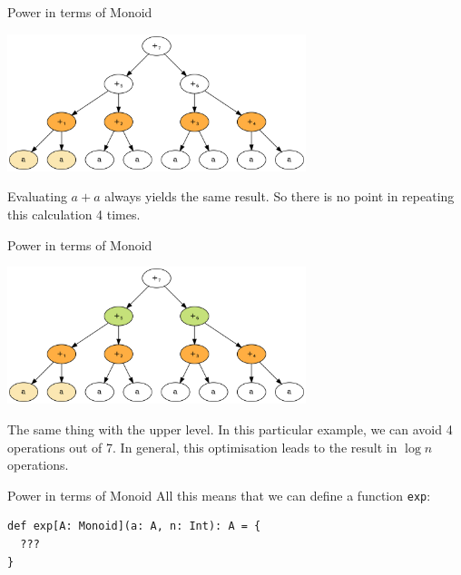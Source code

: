 \documentclass[presentation,aspectratio=169,smaller]{beamer}
\begin{document}
\begin{frame}[label={sec:org1ddd9e8}]{Power in terms of Monoid}
\begin{center}
\includegraphics[height=4cm]{.dot/fold-power-2.png}
\end{center}

Evaluating \(a + a\) always yields the same result. So there is no point in
repeating this calculation 4 times.
\end{frame}

\begin{frame}[label={sec:org5d30d90}]{Power in terms of Monoid}
\begin{center}
\includegraphics[height=4cm]{.dot/fold-power-3.png}
\end{center}

The same thing with the upper level. In this particular example, we can avoid 4
operations out of 7. In general, this optimisation leads to the result in \(\log
n\) operations.
\end{frame}

\begin{frame}[label={sec:org25c8851},fragile]{Power in terms of Monoid}
 All this means that we can define a function \texttt{exp}:

\begin{verbatim}
def exp[A: Monoid](a: A, n: Int): A = {
  ???
}
\end{verbatim}
\end{frame}
\end{document}
